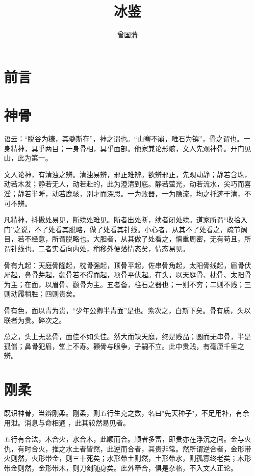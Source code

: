 \documentclass[12pt,UTF8]{ctexbook}
\title{\heiti\zihao{0} 冰鉴}
\author{曾国藩}
\date{}
\begin{document}
\maketitle
\tableofcontents

\frontmatter
\chapter{前言}



\mainmatter

\chapter{神骨}

语云：“脱谷为糠，其髓斯存”，神之谓也。“山骞不崩，唯石为镇”，骨之谓也。一身精神，具乎两目；一身骨相，具乎面部。他家兼论形骸，文人先观神骨。开门见山，此为第一。

文人论神，有清浊之辨。清浊易辨，邪正难辨。欲辨邪正，先观动静；静若含珠，动若木发；静若无人，动若赴的，此为澄清到底。静若萤光，动若流水，尖巧而喜淫；静若半睡，动若鹿骇，别才而深思。一为败器，一为隐流，均之托迹于清，不可不辨。 

凡精神，抖擞处易见，断续处难见。断者出处断，续者闭处续。道家所谓“收拾入门”之说，不了处看其脱略，做了处看其针线。小心者，从其不了处看之，疏节阔目，若不经意，所谓脱略也。大胆者，从其做了处看之，慎重周密，无有苟且，所谓针线也。二者实看向内处，稍移外便落情态矣，情态易见。 

骨有九起：天庭骨隆起，枕骨强起，顶骨平起，佐串骨角起，太阳骨线起，眉骨伏犀起，鼻骨芽起，颧骨若不得而起，项骨平伏起。在头，以天庭骨、枕骨、太阳骨为主；在面，以眉骨、颧骨为主。五者备，柱石之器也；一则不穷；二则不贱；三则动履稍胜；四则贵矣。 

骨有色，面以青为贵，“少年公卿半青面”是也。紫次之，白斯下矣。骨有质，头以联者为贵。碎次之。

总之，头上无恶骨，面佳不如头佳。然大而缺天庭，终是贱品；圆而无串骨，半是孤僧；鼻骨犯眉，堂上不寿。颧骨与眼争，子嗣不立。此中贵贱，有毫厘千里之辨。 

\chapter{刚柔}

既识神骨，当辨刚柔。刚柔，则五行生克之数，名曰"先天种子"，不足用补，有余用泄。消息与命相通 ，此其较然易见者。 

五行有合法，木合火，水合木，此顺而合。顺者多富，即贵亦在浮沉之间。金与火仇，有时合火，推之水土者皆然，此逆而合者，其贵非常。然所谓逆合者，金形带火则然，火形带金，则三十死矣；水形带土则然，土形带水，则孤寡终老矣；木形带金则然，金形带木，则刀剑随身矣。此外牵合，俱是杂格，不入文人正论。 
\end{document}
